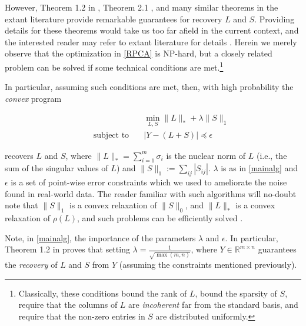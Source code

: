 \documentclass[conference]{IEEEtran}
\begin{document}
However, Theorem 1.2 in \cite{Candes2011}, Theorem 2.1
\cite{Paffenroth2012a}, and many similar theorems in the extant
literature provide remarkable guarantees for recovery $L$ and $S$.
Providing details for these theorems would take us too far afield in
the current context, and the interested reader may refer to extant
literature for details \cite{Candes2009, candes09ex, Chandrasekaran2009,
  Candes2011, Paffenroth2012a, Paffenroth2013b}.
Herein we merely observe that the optimization in \eqref{RPCA} is
NP-hard, but a closely related problem can be solved if some technical
conditions are met.\footnote{Classically, these conditions bound the
  rank of $L$, bound the sparsity of $S$, require that the columns of
  $L$ are \textit{incoherent} far from the standard basis, and require
  that the non-zero entries in $S$ are distributed uniformly.}

In particular, assuming such conditions are met, then, with high
probability the \emph{convex} program

\begin{align} \label{mainalg}
  &\min_{L,S}\|L\|_{*}+\lambda\|S\|_{1}\\ \nonumber
  \qquad \text{subject to} \quad &
                                   |Y-(L+S)|
                                   \preceq \epsilon
\end{align}

\noindent recovers $L$ and $S$, where
$\|L\|_{*} = \sum_{i=1}^m\sigma_{i}$ is the nuclear norm of $L$ (i.e.,
the sum of the singular values of $L$) and
$\|S\|_1:= \sum_{ij}|S_{ij}|$.  $\lambda$ is as in \eqref{mainalg} and
$\epsilon$ is a set of point-wise error constraints which we used to
ameliorate the noise found in real-world data.  The reader familiar
with such algorithms will no-doubt note that $\|S\|_1$ is a convex
relaxation of $\|S\|_0$, and $\|L\|_*$ is a convex relaxation of
$\rho(L)$, and such problems can be efficiently solved
\cite{Boyd2010a, Candes2009, Candes2011, Paffenroth2012a,
  Paffenroth2013b, Halko2011}.

Note, in \eqref{mainalg}, the importance of the parameters $\lambda$
and $\epsilon$.  In particular, Theorem 1.2 in \cite{Candes2011}
proves that setting $\lambda = \frac{1}{\sqrt{\max(m,n)}}$, where
$Y \in \mathbb{R}^{m \times n}$ guarantees the \emph{recovery} of $L$
and $S$ from $Y$ (assuming the constraints mentioned previously).
\end{document}
